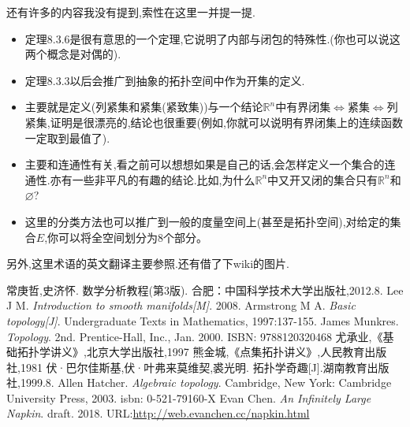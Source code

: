 \documentclass[12pt,A4paper,oneside]{amsart}
\numberwithin{equation}{section}
\theoremstyle{plain}
\theoremstyle{plain}
\theoremstyle{plain}
\numberwithin{equation}{section}
\theoremstyle{remark}
\begin{document}
还有许多的内容我没有提到,索性在这里一并提一提.
\begin{itemize}
	\item 定理8.3.6是很有意思的一个定理,它说明了内部与闭包的特殊性.(你也可以说这两个概念是对偶的).
	\item 定理8.3.3以后会推广到抽象的拓扑空间中作为开集的定义.
	\item \cite[8.4]{CS12}主要就是定义(列紧集和紧集(紧致集))与一个结论$\mathbb{R}^n$中有界闭集$\Leftrightarrow$紧集$\Leftrightarrow$列紧集,证明是很漂亮的,结论也很重要(例如,你就可以说明有界闭集上的连续函数一定取到最值了).
	\item \cite[8.5]{CS12}主要和连通性有关,看之前可以想想如果是自己的话,会怎样定义一个集合的连通性.亦有一些非平凡的有趣的结论.比如,为什么$\mathbb{R}^n$中又开又闭的集合只有$\mathbb{R}^n$和$\varnothing$?
	\item 这里的分类方法也可以推广到一般的度量空间上(甚至是拓扑空间),对给定的集合$E$,你可以将全空间划分为8个部分。
\end{itemize}
另外,这里术语的英文翻译主要参照\cite[Appendix A]{JM08}.还有借了下wiki的图片.















\begin{thebibliography}{99}


%
常庚哲,史济怀. 数学分析教程(第3版). 合肥：中国科学技术大学出版社,2012.8.
%
Lee J M. \emph{Introduction to smooth manifolds[M]}. 2008.
Armstrong M A. \emph{Basic topology[J]}. Undergraduate Texts in Mathematics, 1997:137-155.
James Munkres. \emph{Topology}. 2nd. Prentice-Hall, Inc., Jan. 2000. ISBN: 9788120320468
%
尤承业,《基础拓扑学讲义》,北京大学出版社,1997
%
熊金城,《点集拓扑讲义》,人民教育出版社,1981
%
伏·巴尔佳斯基,伏·叶弗来莫维契,裘光明. 拓扑学奇趣[J].湖南教育出版社,1999.8.
%
Allen Hatcher. \emph{Algebraic topology}. Cambridge, New York: Cambridge University Press, 2003. isbn: 0-521-79160-X
Evan Chen. \emph{An Infinitely Large Napkin}. draft. 2018.
URL:\href{http://web.evanchen.cc/napkin.html}{http://web.evanchen.cc/napkin.html}




\end{thebibliography}
\end{document}
